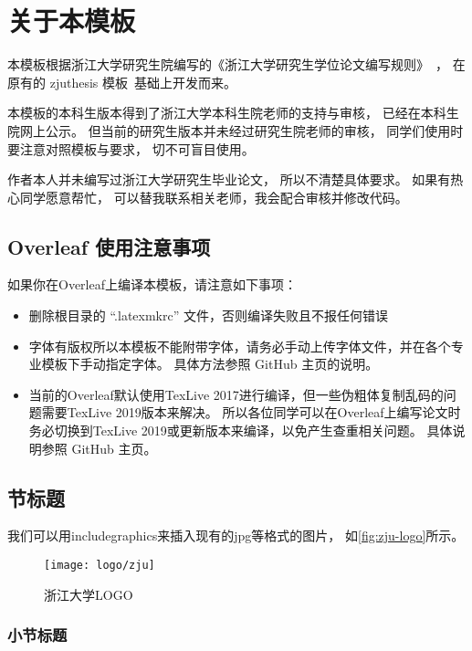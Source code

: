 \chapter{关于本模板}

本模板根据浙江大学研究生院编写的《浙江大学研究生学位论文编写规则》~\cite{zjugradthesisrules}，
在原有的 zjuthesis 模板~\cite{zjuthesis}基础上开发而来。

本模板的本科生版本\cite{zjuthesisrules}得到了浙江大学本科生院老师的支持与审核，
已经在本科生院网上公示。
但当前的研究生版本并未经过研究生院老师的审核，
同学们使用时要注意对照模板与要求，
切不可盲目使用。

作者本人并未编写过浙江大学研究生毕业论文，
所以不清楚具体要求。
如果有热心同学愿意帮忙，
可以替我联系相关老师，我会配合审核并修改代码。

\section{Overleaf 使用注意事项}

如果你在Overleaf上编译本模板，请注意如下事项：

\begin{itemize}
    \item 删除根目录的 ``.latexmkrc'' 文件，否则编译失败且不报任何错误
    \item 字体有版权所以本模板不能附带字体，请务必手动上传字体文件，并在各个专业模板下手动指定字体。
        具体方法参照 GitHub 主页的说明。
    \item 当前的Overleaf默认使用TexLive 2017进行编译，但一些伪粗体复制乱码的问题需要TexLive 2019版本来解决。
        所以各位同学可以在Overleaf上编写论文时务必切换到TexLive 2019或更新版本来编译，以免产生查重相关问题。
        具体说明参照 GitHub 主页。
\end{itemize}


\section{节标题}

我们可以用includegraphics来插入现有的jpg等格式的图片，
如\autoref{fig:zju-logo}所示。

\begin{figure}[htbp]
    \centering
    \texttt{[image: logo/zju]}
    \caption{\label{fig:zju-logo}浙江大学LOGO}
\end{figure}


\subsection{小节标题}


